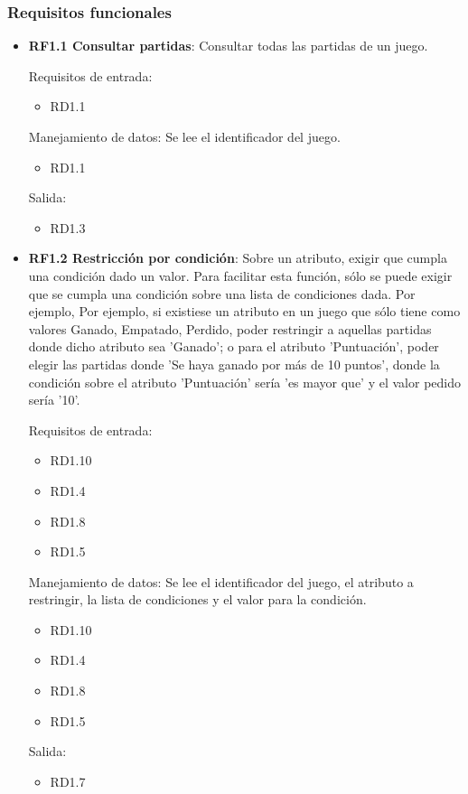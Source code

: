\subsubsection{Requisitos funcionales}
\begin{itemize}
	\item \textbf{RF1.1 Consultar partidas}: Consultar todas las partidas de un juego.
	
	Requisitos de entrada:
	\begin{itemize}
		\item RD1.1
	\end{itemize}
	Manejamiento de datos: Se lee el identificador del juego.
	\begin{itemize}
		\item RD1.1
	\end{itemize}
	Salida:
	\begin{itemize}
		\item RD1.3
	\end{itemize}
	
	
	\item \textbf{RF1.2 Restricción por condición}: Sobre un atributo, exigir que cumpla una condición dado un valor. Para facilitar esta función, sólo se puede exigir que se cumpla una condición sobre una lista de condiciones dada. Por ejemplo, Por ejemplo, si existiese un atributo en un juego que sólo tiene como valores {Ganado, Empatado, Perdido}, poder restringir a aquellas partidas donde dicho atributo sea 'Ganado'; o para el atributo 'Puntuación', poder elegir las partidas donde 'Se haya ganado por más de 10 puntos', donde la condición sobre el atributo 'Puntuación' sería 'es mayor que' y el valor pedido sería '10'.
	
	Requisitos de entrada:
	\begin{itemize}
		\item RD1.10
		\item RD1.4
		\item RD1.8
		\item RD1.5
	\end{itemize}
	Manejamiento de datos: Se lee el identificador del juego, el atributo a restringir, la lista de condiciones y el valor para la condición.
	\begin{itemize}
		\item RD1.10
		\item RD1.4
		\item RD1.8
		\item RD1.5
	\end{itemize}
	Salida:
	\begin{itemize}
		\item RD1.7
	\end{itemize}
	

\end{itemize}
